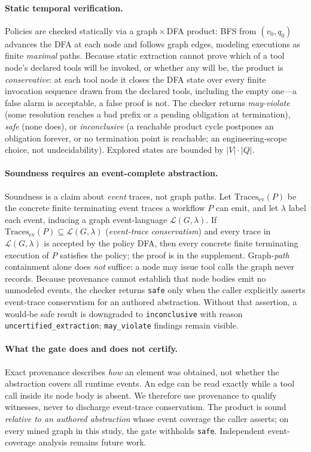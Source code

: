 \paragraph{Static temporal verification.}
Policies are checked statically via a graph\,$\times$\,DFA product: BFS from
$(v_0,q_0)$ advances the DFA at each node and follows graph edges, modeling
executions as finite \emph{maximal} paths. Because static extraction cannot prove
which of a tool node's declared tools will be invoked, or whether any will be,
the product is \emph{conservative}: at each tool node it closes the DFA state
over every finite invocation sequence drawn from the declared tools, including
the empty one---a false alarm is acceptable, a false proof is not. The checker
returns \emph{may-violate} (some resolution reaches a bad prefix or a pending
obligation at termination), \emph{safe} (none does), or \emph{inconclusive} (a
reachable product cycle postpones an obligation forever, or no termination point
is reachable; an engineering-scope choice, not undecidability). Explored states
are bounded by $|V|\cdot|Q|$.

\paragraph{Soundness requires an event-complete abstraction.}
\label{thm:soundness}
Soundness is a claim about \emph{event} traces, not graph paths. Let
$\mathrm{Traces}_{\mathrm{ev}}(P)$ be the concrete finite terminating event traces
a workflow $P$ can emit, and let $\lambda$ label each event, inducing a graph
event-language $\mathcal{L}(G,\lambda)$. If $\mathrm{Traces}_{\mathrm{ev}}(P)\subseteq
\mathcal{L}(G,\lambda)$ (\emph{event-trace conservatism}) and every trace in
$\mathcal{L}(G,\lambda)$ is accepted by the policy DFA, then every concrete finite
terminating execution of $P$ satisfies the policy; the proof is in the
supplement.
Graph-\emph{path} containment alone does \emph{not} suffice: a node may issue tool
calls the graph never records. Because provenance cannot establish that node
bodies emit no unmodeled events, the checker returns \texttt{safe} only when the
caller explicitly asserts event-trace conservatism for an authored abstraction.
Without that assertion, a would-be safe result is downgraded to
\texttt{inconclusive} with reason \texttt{uncertified\_extraction};
\texttt{may\_violate} findings remain visible.

\paragraph{What the gate does and does not certify.}
Exact provenance describes \emph{how} an element was obtained, not whether the
abstraction covers all runtime events. An edge can be read exactly while a tool
call inside its node body is absent. We therefore use provenance to qualify
witnesses, never to discharge event-trace conservatism. The product is sound
\emph{relative to an authored abstraction} whose event coverage the caller
asserts; on every mined graph in this study, the gate withholds
\texttt{safe}. Independent event-coverage analysis remains future work.

